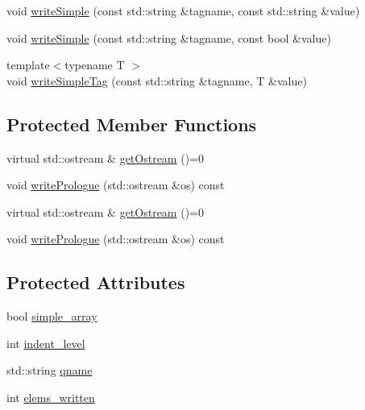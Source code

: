 \begin{DoxyCompactItemize}
\item 
void \mbox{\hyperlink{classXMLStructWriterAPI_1_1XMLStructWriterBase_a32cd25bd69861a05001bb31c5ad9eefe}{write\+Simple}} (const std\+::string \&tagname, const std\+::string \&value)
\item 
void \mbox{\hyperlink{classXMLStructWriterAPI_1_1XMLStructWriterBase_a8e5e47c565c73791739d298b697d66f8}{write\+Simple}} (const std\+::string \&tagname, const bool \&value)
\item 
{\footnotesize template$<$typename T $>$ }\\void \mbox{\hyperlink{classXMLStructWriterAPI_1_1XMLStructWriterBase_a049c80e79c8f64d2b6b0221c01392d37}{write\+Simple\+Tag}} (const std\+::string \&tagname, T \&value)
\end{DoxyCompactItemize}
\subsection*{Protected Member Functions}
\begin{DoxyCompactItemize}
\item 
virtual std\+::ostream \& \mbox{\hyperlink{classXMLStructWriterAPI_1_1XMLStructWriterBase_a48da05057c9f4a021fbe910867bb5f2c}{get\+Ostream}} ()=0
\item 
void \mbox{\hyperlink{classXMLStructWriterAPI_1_1XMLStructWriterBase_a7b8ba2adefb35aa0a0588869b7cca47e}{write\+Prologue}} (std\+::ostream \&os) const
\item 
virtual std\+::ostream \& \mbox{\hyperlink{classXMLStructWriterAPI_1_1XMLStructWriterBase_a48da05057c9f4a021fbe910867bb5f2c}{get\+Ostream}} ()=0
\item 
void \mbox{\hyperlink{classXMLStructWriterAPI_1_1XMLStructWriterBase_a7b8ba2adefb35aa0a0588869b7cca47e}{write\+Prologue}} (std\+::ostream \&os) const
\end{DoxyCompactItemize}
\subsection*{Protected Attributes}
\begin{DoxyCompactItemize}
\item 
bool \mbox{\hyperlink{classXMLStructWriterAPI_1_1XMLStructWriterBase_aee86d78c7ddfc0c64ad946f5d0b8f231}{simple\+\_\+array}}
\item 
int \mbox{\hyperlink{classXMLStructWriterAPI_1_1XMLStructWriterBase_ac592a077855a1377b390f4abff506e38}{indent\+\_\+level}}
\item 
std\+::string \mbox{\hyperlink{classXMLStructWriterAPI_1_1XMLStructWriterBase_a94807da702e56447a602aeae8fb6d9e5}{qname}}
\item 
int \mbox{\hyperlink{classXMLStructWriterAPI_1_1XMLStructWriterBase_a255acd33078c52b9bd9b1f0414cd03e3}{elems\+\_\+written}}
\end{DoxyCompactItemize}


